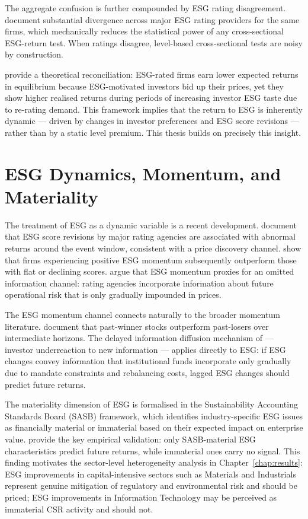 The aggregate confusion is further compounded by ESG rating disagreement. \citet{berg2022aggregate} document substantial divergence across major ESG rating providers for the same firms, which mechanically reduces the statistical power of any cross-sectional ESG-return test. When ratings disagree, level-based cross-sectional tests are noisy by construction.

\citet{pastor2021sustainable} provide a theoretical reconciliation: ESG-rated firms earn lower expected returns in equilibrium because ESG-motivated investors bid up their prices, yet they show higher realised returns during periods of increasing investor ESG taste due to re-rating demand. This framework implies that the return to ESG is inherently dynamic --- driven by changes in investor preferences and ESG score revisions --- rather than by a static level premium. This thesis builds on precisely this insight.

\section{ESG Dynamics, Momentum, and Materiality}

The treatment of ESG as a dynamic variable is a recent development. \citet{giese2019foundations} document that ESG score revisions by major rating agencies are associated with abnormal returns around the event window, consistent with a price discovery channel. \citet{serafeim2020public} show that firms experiencing positive ESG momentum subsequently outperform those with flat or declining scores. \citet{lioui2021esg} argue that ESG momentum proxies for an omitted information channel: rating agencies incorporate information about future operational risk that is only gradually impounded in prices.

The ESG momentum channel connects naturally to the broader momentum literature. \citet{jegadeesh1993returns} document that past-winner stocks outperform past-losers over intermediate horizons. The delayed information diffusion mechanism of \citet{hong1999unified} --- investor underreaction to new information --- applies directly to ESG: if ESG changes convey information that institutional funds incorporate only gradually due to mandate constraints and rebalancing costs, lagged ESG changes should predict future returns.

The materiality dimension of ESG is formalised in the Sustainability Accounting Standards Board (SASB) framework, which identifies industry-specific ESG issues as financially material or immaterial based on their expected impact on enterprise value. \citet{khan2016corporate} provide the key empirical validation: only SASB-material ESG characteristics predict future returns, while immaterial ones carry no signal. This finding motivates the sector-level heterogeneity analysis in Chapter~\ref{chap:results}: ESG improvements in capital-intensive sectors such as Materials and Industrials represent genuine mitigation of regulatory and environmental risk and should be priced; ESG improvements in Information Technology may be perceived as immaterial CSR activity and should not.


